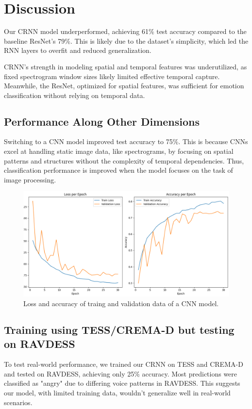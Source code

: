 \documentclass[../main.tex]{subfiles}
\begin{document}
\section{Discussion}

Our CRNN model underperformed, achieving 61\% test accuracy compared to the 
baseline ResNet's 79\%. This is likely due to the dataset's simplicity, which 
led the RNN layers to overfit and reduced generalization.

CRNN's strength in modeling spatial and temporal features was underutilized, as 
fixed spectrogram window sizes likely limited effective temporal capture. 
Meanwhile, the ResNet, optimized for spatial features, was sufficient for 
emotion classification without relying on temporal data.

\subsection{Performance Along Other Dimensions}

Switching to a CNN model improved test accuracy to 75\%. This is because 
CNNs excel at handling static image data, like spectrograms, by focusing on 
spatial patterns and structures without the complexity of temporal dependencies. Thus, 
classification performance is improved when the model focuses on the task of 
image processing.

\begin{figure}[h]
    \centering
    \includegraphics[width=.5\linewidth]{../resources/cnn_mixed.png}
    \caption{Loss and accuracy of traing and validation data of a CNN model.}
    \label{fig:cnn_mixed}
\end{figure}

\subsection{Training using TESS/CREMA-D but testing on RAVDESS}

To test real-world performance, we trained our CRNN on TESS and CREMA-D 
and tested on RAVDESS, achieving only 25\% accuracy. Most predictions were 
classified as "angry" due to differing voice patterns in RAVDESS. This 
suggests our model, with limited training data, wouldn't generalize well 
in real-world scenarios.
\end{document}
